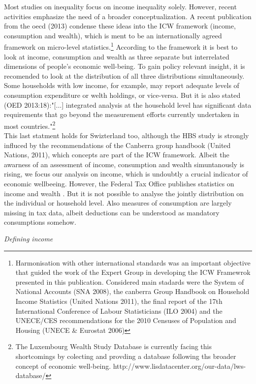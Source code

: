 \documentclass[twoside]{article}\usepackage[]{graphicx}\usepackage[]{color}
\begin{document}
\begin{multicols}{2}
Most studies on inequality focus on income inequality solely. However, recent activities emphasize the need of a broader conceptualization. A recent publication from the oecd (2013) condense these ideas into the ICW framework (income, consumption and wealth), which is ment to be an internationally agreed framework on micro-level statistics.\footnote{Harmonisation with other international standards was an important objective that guided the work of the Expert Group in developing the ICW Framewrok presented in this publication. Considered main stadards were the System of National Accounts (SNA 2008), the canberra Group Handbook on Household Income Statistics (United Nations 2011), the final report of the 17th International Conference of Labour Statisticians (ILO 2004) and the UNECE/CES recommendations for the 2010 Censuses of Population and Housing (UNECE & Eurostat 2006)} According to the framework it is best to look at income, consumption and wealth as three separate but interrelated dimensions of people's economic well-being. To gain policy relevant insight, it is recomended to look at the distribution of all three distributions simultaneously. Some households with low income, for example, may report adequate levels of consumption expenditure or welth holdings, or vice-versa. But it is also stated (OED 2013:18):"[...] integrated analysis at the household level has significant data requirements that go beyond the measurement efforts currently undertaken in most countries."\footnote{The Luxembourg Wealth Study Database is currently facing this shortcomings by colecting and provding a database following ths broader concept of economic well-being. http://www.lisdatacenter.org/our-data/lws-database/} \\

This last statment holds for Swizterland too, although the HBS study is strongly influced by the recommendations of the Canberra group handbook (United Nations, 2011), which concepts are part of the ICW framework. Albeit the awarness of an assessment of income, consumption and wealth simuntanously is rising, we  focus our analysis on income, which is undoubtly a crucial indicator of economic wellbeeing. However, the Federal Tax Office publishes statistics on income and wealth . But it is not possible to analyse the jointly distribution on the individual or household level. Also measures of consumption are largely missing in tax data, albeit deductions can be understood as mandatory consumptions somehow.


\emph{Defining income}


\end{multicols}
\end{document}
